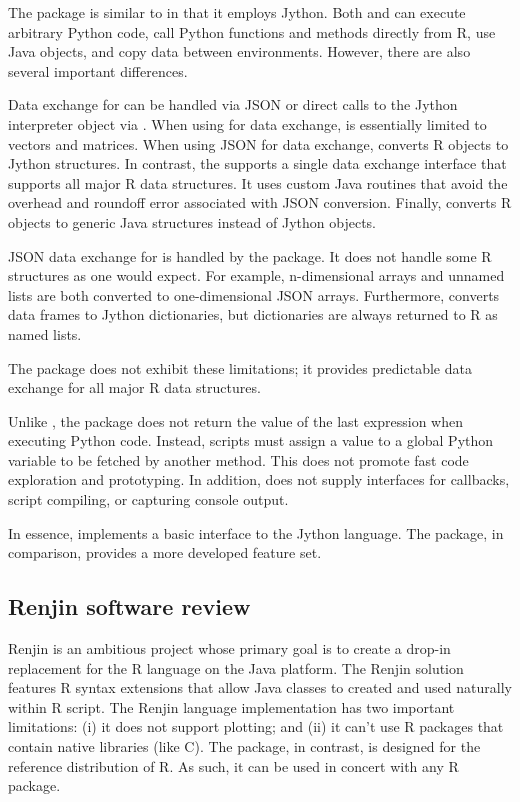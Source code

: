 The  package is similar to  in that it employs Jython. Both  and  can execute arbitrary Python code, call Python functions and methods directly from R, use Java objects, and copy data between environments. However, there are also several important differences.

Data exchange for  can be handled via JSON or direct calls to the Jython interpreter object via . When using  for data exchange,  is essentially limited to vectors and matrices. When using JSON for data exchange,  converts R objects to Jython structures. In contrast, the  supports a single data exchange interface that supports all major R data structures. It uses custom Java routines that avoid the overhead and roundoff error associated with JSON conversion. Finally,  converts R objects to generic Java structures instead of Jython objects.

JSON data exchange for  is handled by the  \citep{rjson} package. It does not handle some R structures as one would expect. For example, n-dimensional arrays and unnamed lists are both converted to one-dimensional JSON arrays. Furthermore,  converts data frames to Jython dictionaries, but dictionaries are always returned to R as named lists. 

The  package does not exhibit these limitations; it provides predictable data exchange for all major R data structures.

Unlike , the  package does not return the value of the last expression when executing Python code. Instead, scripts must assign a value to a global Python variable to be fetched by another  method. This does not promote fast code exploration and prototyping. In addition,  does not supply interfaces for callbacks, script compiling, or capturing console output.

In essence,  implements a basic interface to the Jython language. The  package, in comparison, provides a more developed feature set.

\subsection{Renjin software review}

Renjin \citep{renjin} is an ambitious project whose primary goal is to create a drop-in replacement for the R language on the Java platform. The Renjin solution features R syntax extensions that allow Java classes to created and used naturally within R script. The Renjin language implementation has two important limitations: (i) it does not support plotting; and (ii) it can't use R packages that contain native libraries (like C). The  package, in contrast, is designed for the reference distribution of R. As such, it can be used in concert with any R package.

